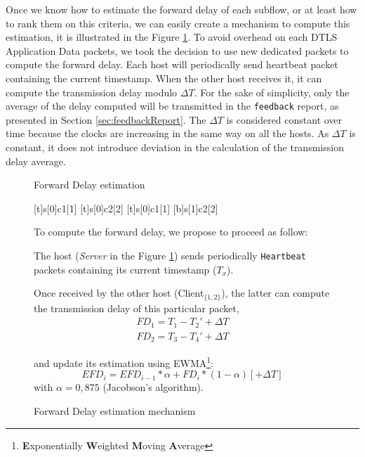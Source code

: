 Once we know how to estimate the forward delay of each subflow, or at least how to rank them on this criteria, we can easily create a mechanism to compute this estimation, it is illustrated in the Figure \ref{fig:forwardDelayComputation}. To avoid overhead on each DTLS Application Data packets, we took the decision to use new dedicated packets to compute the forward delay. Each host will periodically send heartbeat packet containing the current timestamp. When the other host receives it, it can compute the transmission delay modulo $\Delta T$. For the sake of simplicity, only the average of the delay computed will be transmitted in the \texttt{feedback} report, as presented in Section \ref{sec:feedbackReport}. The $\Delta T$ is considered constant over time because the clocks are increasing in the same way on all the hosts. As $\Delta T$ is constant, it does not introduce deviation in the calculation of the transmission delay average. 

\begin{figure}[!ht]
\begin{minipage}[c]{.54\linewidth}
\begin{msc}[r]{Forward Delay estimation}

\setlength{\instfootheight}{0em}
\setlength{\instheadheight}{0em}
\setlength{\instdist}{0.25\linewidth}
\setlength{\levelheight}{3em}


[t]{s}[0]{c1}[1]
\nextlevel
{}[t]{s}[0]{c2}[2]
\nextlevel
{}[t]{s}[0]{c1}[1]
[b]{s}[1]{c2}[2]
\nextlevel
{}
\nextlevel
{}
\nextlevel
\end{msc}
\caption{Forward Delay estimation mechanism}
\label{fig:forwardDelayComputation}
\end{minipage}
\begin{minipage}[c]{.44\linewidth}
To compute the forward delay, we propose to proceed as follow:

The host (\textit{Server} in the Figure \ref{fig:forwardDelayComputation}) sends periodically \texttt{Heartbeat} packets containing its current timestamp ($T_x$).

Once received by the other host (Client$_{\{1,2\}}$), the latter can compute the transmission delay of this particular packet,
\begin{align*}
FD_1 = T_1 - T_2' + \Delta{}T\\
FD_2 = T_3 - T_4' + \Delta{}T
\end{align*}

and update its estimation using EWMA\footnote{\textbf{E}xponentially \textbf{W}eighted \textbf{M}oving \textbf{A}verage}:
$$EFD_{i} = EFD_{i-1}*\alpha + FD_i*(1-\alpha) [+ \Delta T]$$
with $\alpha = 0,875$ (Jacobson's algorithm).
\end{minipage}
\end{figure}


